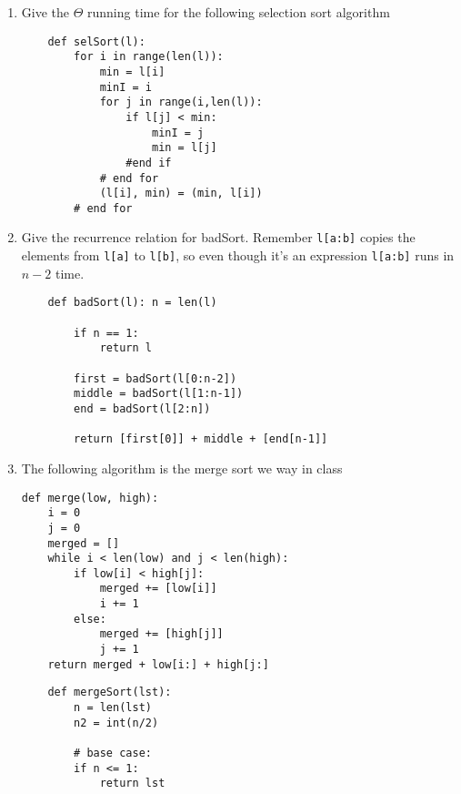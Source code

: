 \documentclass[basic, header]{nosvagor-notes}
\begin{document}
\begin{enumerate}[itemsep=4em]
  \item

    Give the $\Theta$ running time for the following selection sort algorithm
    \begin{verbatim}
    def selSort(l):
        for i in range(len(l)):
            min = l[i]
            minI = i
            for j in range(i,len(l)):
                if l[j] < min:
                    minI = j
                    min = l[j]
                #end if
            # end for
            (l[i], min) = (min, l[i])
        # end for
    \end{verbatim}

  \newpage %

  \item Give the recurrence relation for badSort. Remember \texttt{l[a:b]}
    copies the elements from \texttt{l[a]} to \texttt{l[b]}, so even though
    it's an expression \texttt{l[a:b]} runs in $n-2$ time.

    \begin{verbatim}
    def badSort(l): n = len(l)

        if n == 1:
            return l

        first = badSort(l[0:n-2])
        middle = badSort(l[1:n-1])
        end = badSort(l[2:n])

        return [first[0]] + middle + [end[n-1]]
    \end{verbatim}

  \newpage %

  \item The following algorithm is the merge sort we way in class

    \begin{multicols}{2}
      \begin{verbatim}
def merge(low, high):
    i = 0
    j = 0
    merged = []
    while i < len(low) and j < len(high):
        if low[i] < high[j]:
            merged += [low[i]]
            i += 1
        else:
            merged += [high[j]]
            j += 1
    return merged + low[i:] + high[j:]
      \end{verbatim}
      \vspace{5em}
      \begin{verbatim}
    def mergeSort(lst):
        n = len(lst)
        n2 = int(n/2)

        # base case:
        if n <= 1:
            return lst


\end{verbatim}
\end{multicols}
\end{enumerate}
\end{document}
